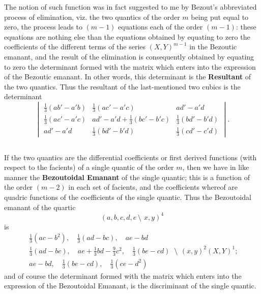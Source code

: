\documentclass[11pt,a4paper]{book}
\begin{document}
\begin{center}
The notion of such function was in fact suggested to me by Bezout's abbreviated process of elimination, viz. the two quantics of the order $m$ being put equal to zero, the process leads to $(m - 1)$ equations each of the order $(m - 1)$: these equations are nothing else than the equations obtained by equating to zero the coefficients of the different terms of the series $(X, Y)^{m-1}$ in the Bezoutic emanant, and the result of the elimination is consequently obtained by equating to zero the determinant formed with the matrix which enters into the expression of the Bezoutic emanant. In other words, this determinant is the \textbf{Resultant} of the two quantics. Thus the resultant of the last-mentioned two cubics is the determinant
\[
\begin{vmatrix}
\frac{1}{3}(ab' - a'b) & \frac{1}{3}(ac' - a'c) & ad' - a'd \\
\frac{1}{3}(ac' - a'c) & ad' - a'd + \frac{1}{3}(bc' - b'c) & \frac{1}{3}(bd' - b'd) \\
ad' - a'd & \frac{1}{3}(bd' - b'd) & \frac{1}{3}(cd' - c'd)
\end{vmatrix}.
\]

\subsection{}

If the two quantics are the differential coefficients or first derived functions (with respect to the facients) of a single quantic of the order $m$, then we have in like manner the \textbf{Bezoutoidal Emanant} of the single quantic; this is a function of the order $(m - 2)$ in each set of facients, and the coefficients whereof are quadric functions of the coefficients of the single quantic. Thus the Bezoutoidal emanant of the quartic
\[
(a, b, c, d, e\,\setminus\!\!\:\, x, y)^4
\]
is
\[
\begin{array}{c}
\frac{1}{3}(ac - b^2), \quad \frac{1}{3}(ad - bc), \quad ae - bd \\
\frac{1}{3}(ad - bc), \quad ae + \frac{1}{3}bd - \frac{9}{3}c^2, \quad \frac{1}{3}(be - cd) \\
ae - bd, \quad \frac{1}{3}(be - cd), \quad \frac{1}{3}(ce - d^2)
\end{array}
\,\setminus\!\!\:\, (x, y)^2(X, Y)^1;
\]
and of course the determinant formed with the matrix which enters into the expression of the Bezoutoidal Emanant, is the discriminant of the single quantic.

\subsection{}


\end{center}
\end{document}
